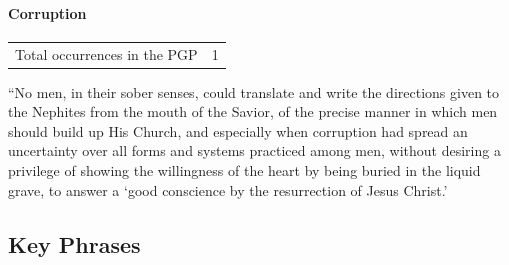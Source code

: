 		\paragraph{Corruption}
		
			\begin{tabular}{ll}
				Total occurrences in the PGP & 1
			\end{tabular}
			
			\begin{compactdesc}
				\item[JS-H Note 3] ``No men, in their sober senses, could translate and write the directions given to the Nephites from the mouth of the Savior, of the precise manner in which men should build up His Church, and especially when corruption had spread an uncertainty over all forms and systems practiced among men, without desiring a privilege of showing the willingness of the heart by being buried in the liquid grave, to answer a `good conscience by the resurrection of Jesus Christ.'
			\end{compactdesc}
		
\subsection{Key Phrases} %
	\label{CORRUPTION-PHRASES}

